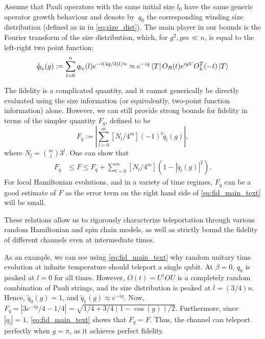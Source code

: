 \documentclass[aps,pra,reprint,floatfix,superscriptaddress, nofootinbib,longbibliography,onecolumn,notitlepage,12pt, tightenlines]{revtex4-1}
\begin{document}
Assume that Pauli operators with the same initial size $l_0$ have the same generic operator growth behaviour and denote by~$q_0$ the corresponding winding size distribution (defined as in in \cref{eq:size_dist}).
The main player in our bounds is the Fourier transform of the size distribution, which, for $g^2,gm \ll n$, is equal to the left-right two point function:
\begin{equation}\label{eq:qtildemaintext}
 \tilde {q}_{l_0}(g) := \sum_{l=0}^n q_{l_0}(l) e^{-i (4g/3)l/n} \approx e^{-ig} \bra T  O_R(t) e^{igV} O_L^T(-t) \ket T
\end{equation}

The fidelity is a complicated quantity, and it cannot generically be directly evaluated using the size information (or equivalently, two-point function information) alone. However, we can still provide strong bounds for fidelity in terms of the simpler quantity $F_q$, defined to be
\begin{equation}
    F_q := \left| \sum\limits_{l=0}^{m} \left[N_l/4^m\right](-1)^l\tilde q_l(g) \right|,
\end{equation}
where $N_l = \binom{m}{l}3^l$. One can show that
\begin{align}
 F_q &\leq F \leq F_q + \sum\limits_{l=0}^{m} [N_l/4^m](1- |\tilde q_l(g)|^2).\label{eq:fid_main_text}
\end{align}
For local Hamiltonian evolutions, and in a variety of time regimes, $F_q$ can be a good estimate of $F$ as the error term on the right hand side of \cref{eq:fid_main_text} will be small.

 These relations allow us to rigorously characterize teleportation through various random Hamiltonian and spin chain models, as well as strictly bound the fidelity of different channels even at intermediate times.

As an example, we can see using \cref{eq:fid_main_text} why random unitary time evolution at infinite temperature should teleport a single qubit. At $\beta=0$, $q_{0}$ is peaked at $l=0$ for all times. However, $O(t) = U^\dagger O U$ is a completely random combination of Pauli strings, and its size distribution is peaked at $l= (3/4)n$. Hence, $\tilde q_0(g) = 1$, and $\tilde q_1(g) \approx e^{-ig}$. Now, $F_q = |3e^{-ig}/4 -1/4|=\sqrt{1/4+3/4( 1 - \cos(g))/2 }$. Furthermore, since $|q_l|=1$, \cref{eq:fid_main_text} shows that $F_q=F$. Thus, the channel can teleport perfectly when $g=\pi$, as it achieves perfect fidelity.
\end{document}
